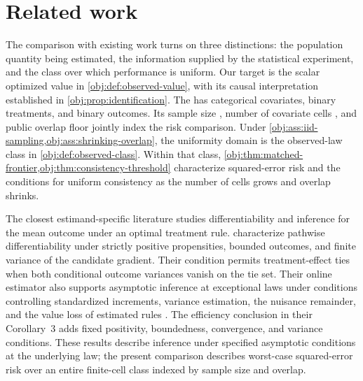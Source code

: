 \documentclass[11pt]{article}
\begin{document}
\section{Related work}

The comparison with existing work turns on three distinctions: the population quantity being estimated, the information supplied by the statistical experiment, and the class over which performance is uniform. Our target is the scalar optimized value in \cref{obj:def:observed-value}, with its causal interpretation established in \cref{obj:prop:identification}. The  has categorical covariates, binary treatments, and binary outcomes. Its sample size , number of covariate cells , and public overlap floor  jointly index the risk comparison. Under \cref{obj:ass:iid-sampling,obj:ass:shrinking-overlap}, the uniformity domain is the observed-law class in \cref{obj:def:observed-class}. Within that class, \cref{obj:thm:matched-frontier,obj:thm:consistency-threshold} characterize squared-error risk and the conditions for uniform consistency as the number of cells grows and overlap shrinks.

The closest estimand-specific literature studies differentiability and inference for the mean outcome under an optimal treatment rule. \citet[Theorem~1 and equation~(3)]{LuedtkeVanderLaan2016OptimalValue} characterize pathwise differentiability under strictly positive propensities, bounded outcomes, and finite variance of the candidate gradient. Their condition permits treatment-effect ties when both conditional outcome variances vanish on the tie set. Their online estimator also supports asymptotic inference at exceptional laws under conditions controlling standardized increments, variance estimation, the nuisance remainder, and the value loss of estimated rules \citep[Theorem~2, conditions~(C1)--(C5)]{LuedtkeVanderLaan2016OptimalValue}. The efficiency conclusion in their Corollary~3 adds fixed positivity, boundedness, convergence, and variance conditions. These results describe inference under specified asymptotic conditions at the underlying law; the present comparison describes worst-case squared-error risk over an entire finite-cell class indexed by sample size and overlap.
\end{document}
